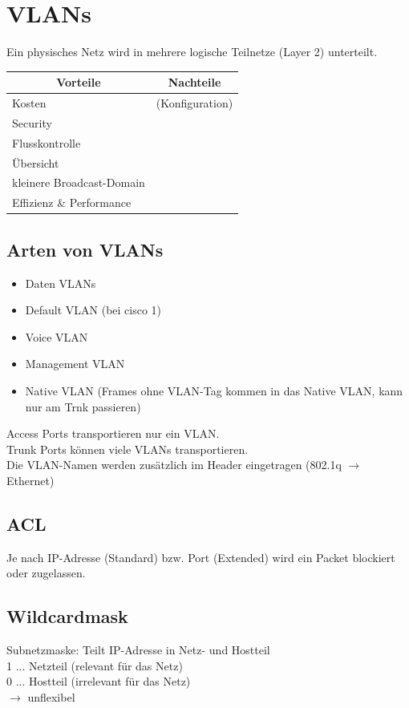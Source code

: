 \section{VLANs}
Ein physisches Netz wird in mehrere logische Teilnetze (Layer 2) unterteilt.
\begin{table}[H]
	\begin{tabular}{l|l}
		\multicolumn{1}{c|}{Vorteile} & \multicolumn{1}{c}{Nachteile} \\
		\hline
		Kosten & (Konfiguration) \\
		Security &  \\
		Flusskontrolle &  \\
		Übersicht &  \\
		kleinere Broadcast-Domain &  \\
		Effizienz \& Performance & 
	\end{tabular}
\end{table}

\subsection*{Arten von VLANs}
\begin{itemize}
	\item Daten VLANs
	\item Default VLAN (bei cisco 1)
	\item Voice VLAN
	\item Management VLAN
	\item Native VLAN (Frames ohne VLAN-Tag kommen in das Native VLAN, kann nur am Trnk passieren)
\end{itemize}

Access Ports transportieren nur ein VLAN. \\
Trunk Ports können viele VLANs transportieren. \\
Die VLAN-Namen werden zusätzlich im Header eingetragen (802.1q $\rightarrow$ Ethernet)

\subsection*{ACL}
Je nach IP-Adresse (Standard) bzw. Port (Extended) wird ein Packet blockiert oder zugelassen.

\subsection*{Wildcardmask}
Subnetzmaske: Teilt IP-Adresse in Netz- und Hostteil \\
1 ... Netzteil (relevant für das Netz) \\
0 ... Hostteil (irrelevant für das Netz) \\
$\rightarrow$ unflexibel

